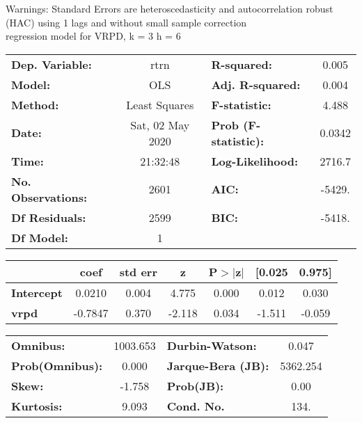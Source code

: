 Warnings: \newline
 [1] Standard Errors are heteroscedasticity and autocorrelation robust (HAC) using 1 lags and without small sample correction\\ 

regression model for VRPD, k = 3 h = 6\begin{center}
\begin{tabular}{lclc}
\toprule
\textbf{Dep. Variable:}    &       rtrn       & \textbf{  R-squared:         } &     0.005   \\
\textbf{Model:}            &       OLS        & \textbf{  Adj. R-squared:    } &     0.004   \\
\textbf{Method:}           &  Least Squares   & \textbf{  F-statistic:       } &     4.488   \\
\textbf{Date:}             & Sat, 02 May 2020 & \textbf{  Prob (F-statistic):} &   0.0342    \\
\textbf{Time:}             &     21:32:48     & \textbf{  Log-Likelihood:    } &    2716.7   \\
\textbf{No. Observations:} &        2601      & \textbf{  AIC:               } &    -5429.   \\
\textbf{Df Residuals:}     &        2599      & \textbf{  BIC:               } &    -5418.   \\
\textbf{Df Model:}         &           1      & \textbf{                     } &             \\
\bottomrule
\end{tabular}
\begin{tabular}{lcccccc}
                   & \textbf{coef} & \textbf{std err} & \textbf{z} & \textbf{P$> |$z$|$} & \textbf{[0.025} & \textbf{0.975]}  \\
\midrule
\textbf{Intercept} &       0.0210  &        0.004     &     4.775  &         0.000        &        0.012    &        0.030     \\
\textbf{vrpd}      &      -0.7847  &        0.370     &    -2.118  &         0.034        &       -1.511    &       -0.059     \\
\bottomrule
\end{tabular}
\begin{tabular}{lclc}
\textbf{Omnibus:}       & 1003.653 & \textbf{  Durbin-Watson:     } &    0.047  \\
\textbf{Prob(Omnibus):} &   0.000  & \textbf{  Jarque-Bera (JB):  } & 5362.254  \\
\textbf{Skew:}          &  -1.758  & \textbf{  Prob(JB):          } &     0.00  \\
\textbf{Kurtosis:}      &   9.093  & \textbf{  Cond. No.          } &     134.  \\
\bottomrule
\end{tabular}
\end{center}

